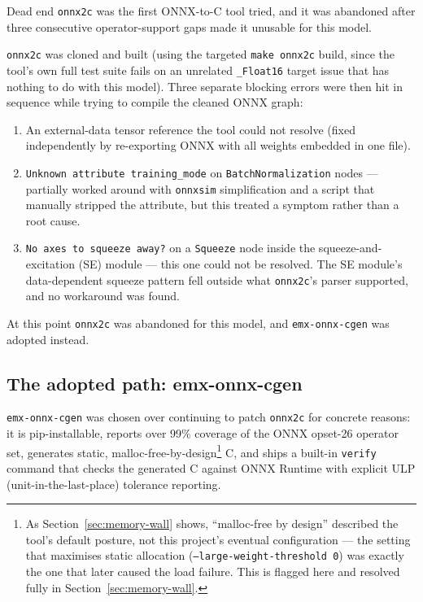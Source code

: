 \documentclass[11pt,a4paper]{report}
\newcommand{\code}[1]{\texttt{\small #1}}
\begin{document}
\begin{crisisbox}{Dead end}
\code{onnx2c} was the first ONNX-to-C tool tried, and it was abandoned after three consecutive
operator-support gaps made it unusable for this model.
\end{crisisbox}

\code{onnx2c} was cloned and built (using the targeted \code{make onnx2c} build, since the tool's
own full test suite fails on an unrelated \code{\_Float16} target issue that has nothing to do with
this model). Three separate blocking errors were then hit in sequence while trying to compile the
cleaned ONNX graph:

\begin{enumerate}[leftmargin=1.5em]
  \item An external-data tensor reference the tool could not resolve (fixed independently by
  re-exporting ONNX with all weights embedded in one file).
  \item \code{Unknown attribute training\_mode} on \code{BatchNormalization} nodes --- partially
  worked around with \code{onnxsim} simplification and a script that manually stripped the
  attribute, but this treated a symptom rather than a root cause.
  \item \code{No axes to squeeze away?} on a \code{Squeeze} node inside the squeeze-and-excitation
  (SE) module --- this one could not be resolved. The SE module's data-dependent squeeze pattern
  fell outside what \code{onnx2c}'s parser supported, and no workaround was found.
\end{enumerate}

At this point \code{onnx2c} was abandoned for this model, and \code{emx-onnx-cgen} was adopted
instead.

\subsection{The adopted path: emx-onnx-cgen}

\code{emx-onnx-cgen} was chosen over continuing to patch \code{onnx2c} for concrete reasons: it is
pip-installable, reports over 99\% coverage of the ONNX opset-26 operator set, generates static,
malloc-free-by-design\footnote{As Section~\ref{sec:memory-wall} shows, ``malloc-free by design''
described the tool's default posture, not this project's eventual configuration --- the setting
that maximises static allocation (\code{--large-weight-threshold 0}) was exactly the one that later
caused the load failure. This is flagged here and resolved fully in Section~\ref{sec:memory-wall}.}
C, and ships a built-in \code{verify} command that checks the generated C against ONNX Runtime with
explicit ULP (unit-in-the-last-place) tolerance reporting.
\end{document}
